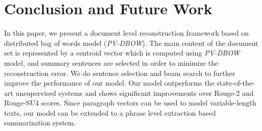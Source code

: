 \documentclass[11pt,a4paper]{article}
\begin{document}



\section{Conclusion and Future Work}

In this paper, we present a document level reconstruction framework based on distributed bag of words model (\textit{PV-DBOW}). The main content of the document set is represented by a centroid vector which is computed using \textit{PV-DBOW} model, and summary sentences are selected in order to minimize the reconstruction error. We do sentence selection and beam search to further improve the performance of our model. Our model outperforms the state-of-the-art unsupervised systems and shows significant improvements over Rouge-2 and Rouge-SU4 scores. Since paragraph vectors can be used to model variable-length texts, our model can be extended to a phrase level extraction based summarization system. 





\appendix
\end{document}
